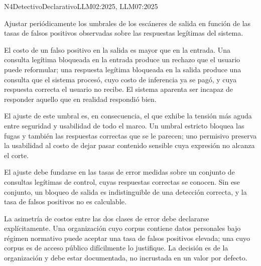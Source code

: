 
  {N4}{Detectivo}{Declarativo}{LLM02:2025, LLM07:2025}

Ajustar periódicamente los umbrales de los escáneres de salida en función de las tasas de falsos positivos observadas sobre las respuestas legítimas del sistema.

El costo de un falso positivo en la salida es mayor que en la entrada. Una consulta legítima bloqueada en la entrada produce un rechazo que el usuario puede reformular; una respuesta legítima bloqueada en la salida produce una consulta que el sistema procesó, cuyo costo de inferencia ya se pagó, y cuya respuesta correcta el usuario no recibe. El sistema aparenta ser incapaz de responder aquello que en realidad respondió bien.

El ajuste de este umbral es, en consecuencia, el que exhibe la tensión más aguda entre seguridad y usabilidad de todo el marco. Un umbral estricto bloquea las fugas y también las respuestas correctas que se le parecen; uno permisivo preserva la usabilidad al costo de dejar pasar contenido sensible cuya expresión no alcanza el corte.

El ajuste debe fundarse en las tasas de error medidas sobre un conjunto de consultas legítimas de control, cuyas respuestas correctas se conocen. Sin ese conjunto, un bloqueo de salida es indistinguible de una detección correcta, y la tasa de falsos positivos no es calculable.

La asimetría de costos entre las dos clases de error debe declararse explícitamente. Una organización cuyo corpus contiene datos personales bajo régimen normativo puede aceptar una tasa de falsos positivos elevada; una cuyo corpus es de acceso público difícilmente lo justifique. La decisión es de la organización y debe estar documentada, no incrustada en un valor por defecto.


